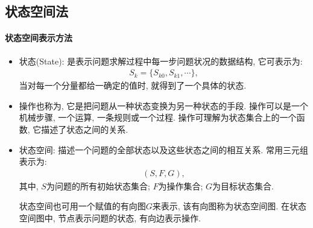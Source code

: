 \subsection{状态空间法}
\paragraph{状态空间表示方法}
\begin{itemize}
\item 状态(State): 是表示问题求解过程中每一步问题状况的数据结构, 它可表示为:
\begin{align}
    S_k=\{S_{k0}, S_{k1}, \cdots\},
\end{align}
当对每一个分量都给一确定的值时, 就得到了一个具体的状态.

\item 操作也称为, 它是把问题从一种状态变换为另一种状态的手段.
操作可以是一个机械步骤, 一个运算, 一条规则或一个过程. 操作可理解为状态集合上的一个函数, 它描述了状态之间的关系.

\item 状态空间: 描述一个问题的全部状态以及这些状态之间的相互关系. 常用三元组表示为:
\begin{align}
    (S, F, G),
\end{align}
其中, $S$为问题的所有初始状态集合; $F$为操作集合; $G$为目标状态集合.

\begin{remark}
    状态空间也可用一个赋值的有向图$G$来表示, 该有向图称为状态空间图. 在状态空间图中, 节点表示问题的状态, 有向边表示操作.
\end{remark}
\end{itemize}
